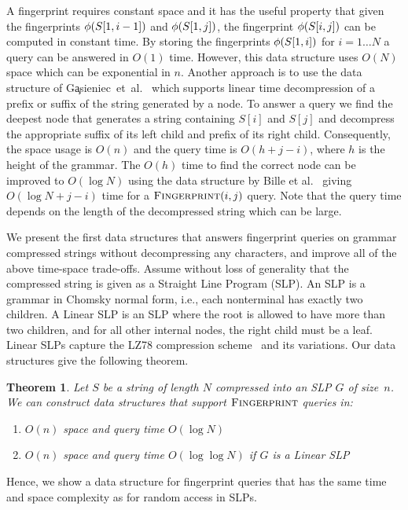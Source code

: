 \documentclass[11pt]{article}
\newtheorem{theorem}{Theorem}
\newcommand{\fingerprintq}{\ensuremath{\textsc{Fingerprint}}}
\newcommand{\fp}{\ensuremath\phi}
\newcommand{\slp}{\ensuremath{G} }
\begin{document}
A fingerprint requires constant space and it has the useful property that given the fingerprints $\fp(\str[1, i-1])$ and $\fp(\str[1, j])$, the fingerprint $\fp(\str[i, j])$ can be computed in constant time. By storing the fingerprints $\fp(\str[1, i])$ for $i=1\ldots N$ a query can be answered in $O(1)$ time. However, this data structure uses $O(N)$ space which can be exponential in $n$. Another approach is to use the data structure of G\c{a}sieniec~et~al.~\cite{gasieniec2005real} which supports linear time decompression of a prefix or suffix of the string generated by a node. To answer a query we find the deepest node that generates a string containing $S[i]$ and $S[j]$ and decompress the appropriate suffix of its left child and prefix of its right child. Consequently, the space usage is $O(n)$ and the query time is $O(h+j-i)$, where $h$ is the height of the grammar. The $O(h)$ time to find the correct node can be improved to $O(\log N)$ using the data structure by Bille et al.~\cite{bille2011random} giving $O(\log N + j-i)$ time for a $\fingerprintq(i, j)$ query. Note that the query time depends on the length of the decompressed string which can be large.

We present the first data structures that answers fingerprint queries on grammar compressed strings without decompressing any characters, and improve all of the above time-space trade-offs. Assume without loss of generality that the compressed string is given as a Straight Line Program (SLP). An SLP is a grammar in Chomsky normal form, i.e., each nonterminal has exactly two children. A Linear SLP is an SLP where the root is allowed to have more than two children, and for all other internal nodes, the right child must be a leaf. Linear SLPs capture the LZ78 compression scheme~\cite{lz78} and its variations. Our data structures give the following theorem.

\begin{theorem}\label{thm:fp}
	Let $S$ be a string of length $N$ compressed into an SLP $\slp$ of size~$n$. We can construct data structures that support $\fingerprintq$ queries in:
	\begin{enumerate}
		\item[(i)] $O(n)$ space and query time $O(\log N)$
		\item[(ii)] $O(n)$ space and query time $O(\log \log N)$ if $\slp$ is a Linear SLP
	\end{enumerate}
\end{theorem}

\noindent Hence, we show a data structure for fingerprint queries that has the same time and space complexity as for random access in SLPs. 
\end{document}
